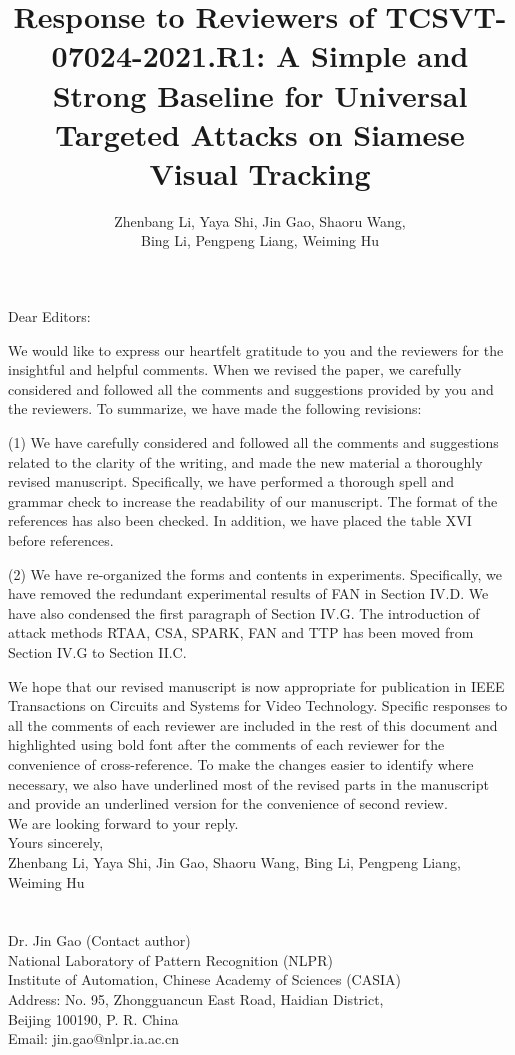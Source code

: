 \documentclass[12pt]{article}
\begin{document}
\linespread{1}
\title{Response to Reviewers of TCSVT-07024-2021.R1: A Simple and Strong Baseline for Universal Targeted Attacks on Siamese Visual Tracking}
\author{Zhenbang Li, Yaya Shi, Jin Gao, Shaoru Wang, \\Bing Li, Pengpeng Liang, Weiming Hu}
\date{}
\maketitle

\noindent Dear Editors:

We would like to express our heartfelt gratitude to you and the reviewers for the insightful and helpful comments. When we revised the paper, we carefully considered and followed all the comments and suggestions provided by you and the reviewers. To summarize, we have made the following revisions:

(1) We have carefully considered and followed all the comments and suggestions related to the clarity of the writing, and made the new material a thoroughly revised manuscript. Specifically, we have performed a thorough spell and grammar check to increase the readability of our manuscript. The format of the references has also been checked. In addition, we have placed the table XVI before references.

(2) We have re-organized the forms and contents in experiments. Specifically, we have removed the redundant experimental results of FAN in Section IV.D. We have also condensed the first paragraph of Section IV.G. The introduction of attack methods RTAA, CSA, SPARK, FAN and TTP has been moved from Section IV.G to Section II.C.

We hope that our revised manuscript is now appropriate for publication in IEEE Transactions on Circuits and Systems for Video Technology. Specific responses to all the comments of each reviewer are included in the rest of this document and highlighted using bold font after the comments of each reviewer for the convenience of cross-reference. To make the changes easier to identify where necessary, we also have underlined most of the revised parts in the manuscript and provide an underlined version for the convenience of second review.\\[10pt]
\indent We are looking forward to your reply.\\[10pt]
\noindent Yours sincerely,\\
\noindent Zhenbang Li, Yaya Shi, Jin Gao, Shaoru Wang, Bing Li, Pengpeng Liang, Weiming Hu
\\
\\
\\
\noindent Dr. Jin Gao (Contact author)\\
\noindent National Laboratory of Pattern Recognition (NLPR)\\
\noindent Institute of Automation, Chinese Academy of Sciences (CASIA)\\
\noindent Address: No. 95, Zhongguancun East Road, Haidian District,\\
\noindent Beijing 100190, P. R. China\\
\noindent Email: jin.gao@nlpr.ia.ac.cn
\end{document}
